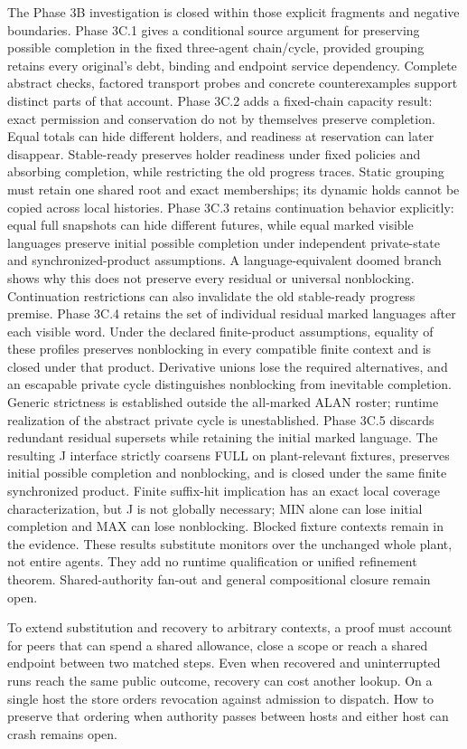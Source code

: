 \documentclass[11pt,a4paper]{article}
\theoremstyle{definition}
\theoremstyle{remark}
\begin{document}
The Phase 3B investigation is closed within those explicit fragments and negative boundaries. Phase 3C.1 gives a conditional source argument for preserving possible completion in the fixed three-agent chain/cycle, provided grouping retains every original's debt, binding and endpoint service dependency. Complete abstract checks, factored transport probes and concrete counterexamples support distinct parts of that account. Phase 3C.2 adds a fixed-chain capacity result: exact permission and conservation do not by themselves preserve completion. Equal totals can hide different holders, and readiness at reservation can later disappear. Stable-ready preserves holder readiness under fixed policies and absorbing completion, while restricting the old progress traces. Static grouping must retain one shared root and exact memberships; its dynamic holds cannot be copied across local histories. Phase 3C.3 retains continuation behavior explicitly: equal full snapshots can hide different futures, while equal marked visible languages preserve initial possible completion under independent private-state and synchronized-product assumptions. A language-equivalent doomed branch shows why this does not preserve every residual or universal nonblocking. Continuation restrictions can also invalidate the old stable-ready progress premise. Phase 3C.4 retains the set of individual residual marked languages after each visible word. Under the declared finite-product assumptions, equality of these profiles preserves nonblocking in every compatible finite context and is closed under that product. Derivative unions lose the required alternatives, and an escapable private cycle distinguishes nonblocking from inevitable completion. Generic strictness is established outside the all-marked ALAN roster; runtime realization of the abstract private cycle is unestablished. Phase 3C.5 discards redundant residual supersets while retaining the initial marked language. The resulting J interface strictly coarsens FULL on plant-relevant fixtures, preserves initial possible completion and nonblocking, and is closed under the same finite synchronized product. Finite suffix-hit implication has an exact local coverage characterization, but J is not globally necessary; MIN alone can lose initial completion and MAX can lose nonblocking. Blocked fixture contexts remain in the evidence. These results substitute monitors over the unchanged whole plant, not entire agents. They add no runtime qualification or unified refinement theorem. Shared-authority fan-out and general compositional closure remain open.

To extend substitution and recovery to arbitrary contexts, a proof must account for peers that can spend a shared allowance, close a scope or reach a shared endpoint between two matched steps. Even when recovered and uninterrupted runs reach the same public outcome, recovery can cost another lookup. On a single host the store orders revocation against admission to dispatch. How to preserve that ordering when authority passes between hosts and either host can crash remains open.



\end{document}
